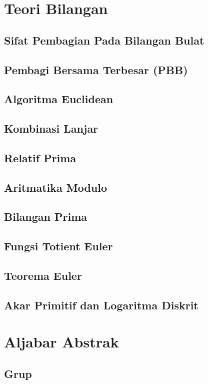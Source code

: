 \documentclass{book}
\begin{document}
    \section{Teori Bilangan}
         \subsection{Sifat Pembagian Pada Bilangan Bulat}
         \subsection{Pembagi Bersama Terbesar (PBB)}
         \subsection{Algoritma Euclidean}
         \subsection{Kombinasi Lanjar}
         \subsection{Relatif Prima}
         \subsection{Aritmatika Modulo}
         \subsection{Bilangan Prima}
         \subsection{Fungsi Totient Euler}
         \subsection{Teorema Euler}
         \subsection{Akar Primitif dan Logaritma Diskrit}
    \section{Aljabar Abstrak}
         \subsection{Grup}
\end{document}
